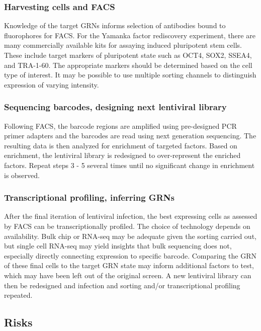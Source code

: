 \documentclass[10pt]{article}
\begin{document}
\subsubsection{Harvesting cells and FACS}

Knowledge of the target GRNs informs selection of antibodies bound to fluorophores for FACS. For the Yamanka factor rediscovery experiment, there are many commercially available kits for assaying induced pluripotent stem cells. These include target markers of pluripotent state such as OCT4, SOX2, SSEA4, and TRA-1-60. The appropriate markers should be determined based on the cell type of interest. It may be possible to use multiple sorting channels to distinguish expression of varying intensity.

\subsubsection{Sequencing barcodes, designing next lentiviral library}

Following FACS, the barcode regions are amplified using pre-designed PCR primer adapters \cite{cheng2014enhanced} and the barcodes are read using next generation sequencing. The resulting data is then analyzed for enrichment of targeted factors. Based on enrichment, the lentiviral library is redesigned to over-represent the enriched factors. Repeat steps 3 - 5 several times until no significant change in enrichment is observed.

\subsubsection{Transcriptional profiling, inferring GRNs}

After the final iteration of lentiviral infection, the best expressing cells as assessed by FACS can be transcriptionally profiled. The choice of technology depends on availability. Bulk chip or RNA-seq may be adequate given the sorting carried out, but single cell RNA-seq may yield insights that bulk sequencing does not, especially directly connecting expression to specific barcode. Comparing the GRN of these final cells to the target GRN state may inform additional factors to test, which may have been left out of the original screen. A new lentiviral library can then be redesigned and infection and sorting and/or transcriptional profiling repeated.

\subsection{Risks}
\end{document}
